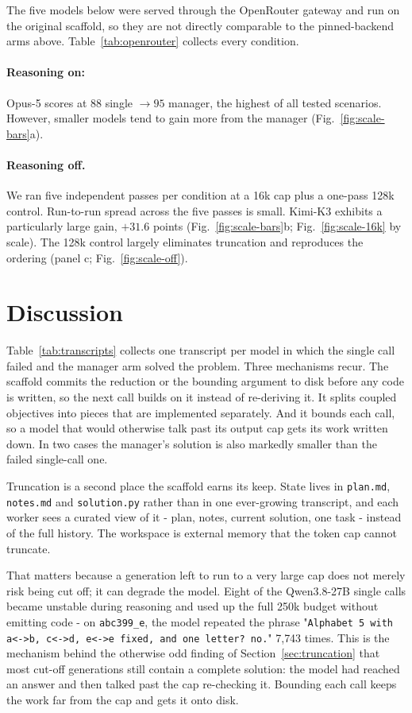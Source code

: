 \documentclass{article}
\begin{document}
The five models below were served through the OpenRouter gateway and run on the original
scaffold, so they are not directly comparable to the pinned-backend arms above.
Table~\ref{tab:openrouter} collects every condition.

\paragraph{Reasoning on:} Opus-5 scores at $88$ single $\to 95$ manager, the highest of all tested scenarios. However, smaller models tend to gain more from the manager (Fig.~\ref{fig:scale-bars}a).

\paragraph{Reasoning off.} We ran five independent
passes per condition at a 16k cap plus a one-pass 128k control. Run-to-run spread across the
five passes is small. Kimi-K3 exhibits a particularly large gain, $+31.6$ points
(Fig.~\ref{fig:scale-bars}b; Fig.~\ref{fig:scale-16k} by scale). The 128k control largely
eliminates truncation and reproduces the ordering (panel c; Fig.~\ref{fig:scale-off}).

\section{Discussion}
\label{sec:discussion}

Table~\ref{tab:transcripts} collects one transcript per model in which the single call failed
and the manager arm solved the problem. Three mechanisms recur. The scaffold commits the
reduction or the bounding argument to disk before any code is written, so the next call builds
on it instead of re-deriving it. It splits coupled objectives into pieces that are implemented
separately. And it bounds each call, so a model that would otherwise talk past its output cap
gets its work written down. In two cases the manager's solution is also markedly smaller than
the failed single-call one.

Truncation is a second place the scaffold earns its keep. State lives in \texttt{plan.md},
\texttt{notes.md} and \texttt{solution.py} rather than in one ever-growing transcript, and
each worker sees a curated view of it - plan, notes, current solution, one task - instead
of the full history. The workspace is external memory that the token cap cannot truncate.

That matters because a generation left to run to a very large cap does not merely risk being
cut off; it can degrade the model. Eight of the Qwen3.8-27B single calls became unstable during reasoning and
used up the full 250k budget without emitting code - on \texttt{abc399\_e},
the model repeated the phrase "\texttt{Alphabet 5 with a<->b, c<->d, e<->e fixed, and one letter? no.}" 7{,}743 times.
This is the mechanism behind the otherwise odd finding of Section~\ref{sec:truncation} that most
cut-off generations still contain a complete solution: the model had reached an answer and
then talked past the cap re-checking it. Bounding each call keeps the work far from the cap and
gets it onto disk.
\end{document}

